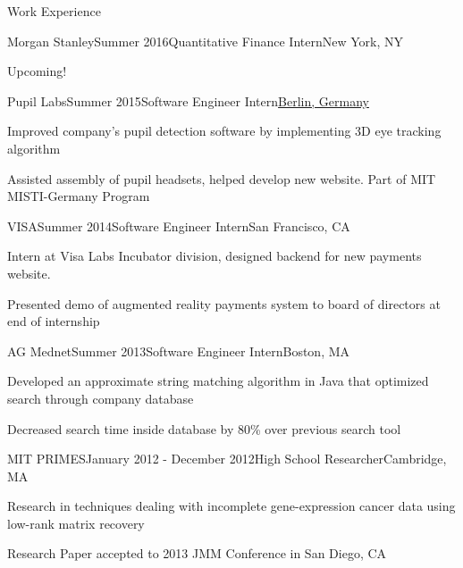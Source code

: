 \documentclass{resume} %
\begin{document}
\begin{rSection}{Work Experience}

\begin{rSubsection}{Morgan Stanley}{Summer 2016}{Quantitative Finance Intern}{New York, NY}
\item Upcoming!
\end{rSubsection}


\begin{rSubsection}{Pupil Labs}{Summer 2015}{Software Engineer Intern}{\underline{Berlin, Germany}}
\item Improved company's pupil detection software by implementing 3D eye tracking algorithm
\item Assisted assembly of pupil headsets, helped develop new website. Part of MIT MISTI-Germany Program
\end{rSubsection}


\begin{rSubsection}{VISA}{Summer 2014}{Software Engineer Intern}{San Francisco, CA}
\item Intern at Visa Labs Incubator division, designed backend for new payments website. 
\item Presented demo of augmented reality payments system to board of directors at end of internship
\end{rSubsection}


\begin{rSubsection}{AG Mednet}{Summer 2013}{Software Engineer Intern}{Boston, MA}
\item Developed an approximate string matching algorithm in Java that optimized search through company database
\item Decreased search time inside database by 80\% over previous search tool
\end{rSubsection}


\begin{rSubsection}{MIT PRIMES}{January 2012 - December 2012}{High School Researcher}{Cambridge, MA}
\item Research in techniques dealing with incomplete gene-expression cancer data using low-rank matrix recovery
\item Research Paper accepted to 2013 JMM Conference in San Diego, CA
\end{rSubsection}

\end{rSection}
\end{document}
